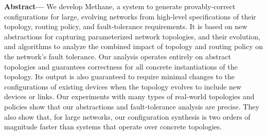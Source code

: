 \documentclass[numbers, 10pt, preprint]{sigplanconf}
\newcommand{\ryan}[1]{\textcolor{green}{[ryan: #1]}}
\newcommand{\sysname}{{\small \sf Methane}\xspace}
\begin{document}
\textbf{Abstract---}
We develop \sysname, a system to generate provably-correct configurations for large, evolving networks from high-level specifications of their topology, routing policy, and fault-tolerance requirements. It is based on new abstractions for capturing parameterized network topologies, and their evolution, and algorithms to analyze the combined impact of topology and routing policy on the network's fault tolerance. Our analysis operates entirely on abstract topologies and guarantees correctness for all concrete instantiations of the topology. Its output is also guaranteed to require minimal changes to the configurations of existing devices when the topology evolves to include new devices or links. Our experiments with many types of real-world topologies and policies show that our abstractions and fault-tolerance analysis are precise. They also show that, for large networks, our configuration synthesis is two orders of magnitude faster than systems that operate over concrete topologies.

\end{document}
